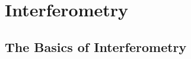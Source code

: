 \chapter{Interferometry}
\label{ch_interferometry}






















\section{The Basics of Interferometry}

